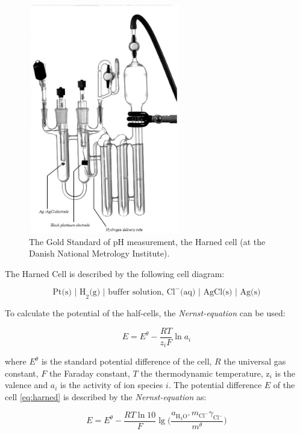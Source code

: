 \begin{figure}
\centering
\includegraphics[height=10cm, keepaspectratio]{img/theory/Harned_bw.jpg}
\caption{The Gold Standard of pH measurement, the Harned cell (at the Danish National Metrology Institute).}
\label{fig:harned}
\end{figure}

The Harned Cell is described by the following cell diagram: 

\begin{equation}
\textrm{Pt(s) | H}_2\textrm{(g) | buffer solution, Cl}^-\textrm{(aq) | AgCl(s) | Ag(s)}
\label{eq:harned}
\end{equation}

To calculate the potential of the half-cells, the \emph{Nernst-equation} can be used:

\begin{equation}
E = E^\theta - \frac{RT}{z_iF}\ln a_i
\end{equation}

where $E^\theta$ is the standard potential difference of the cell, $R$ the universal gas constant, $F$ the Faraday constant, $T$ the thermodynamic temperature, z$_i$ is the valence and $a_i$ is the activity of ion species $i$.
The potential difference $E$ of the cell \ref{eq:harned} is described by the \emph{Nernst-equation} as:

\begin{equation}
E = E^\theta - \frac{RT\ln 10}{F}\lg\bigg(\frac{a_{\textrm{H}_3\textrm{O}^+}m_{\textrm{Cl}^-}\gamma_{\textrm{Cl}^-}}{m^\theta}\bigg)
\end{equation}

